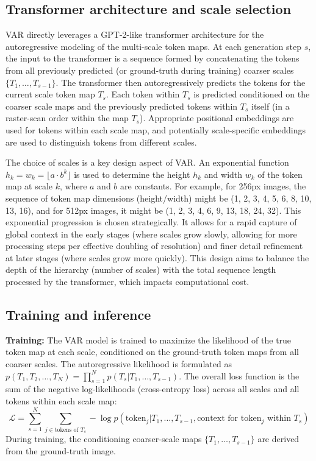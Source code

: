 \documentclass{article}
\begin{document}
\subsection{Transformer architecture and scale selection}
\label{ssec:transformer_scale_selection}

VAR directly leverages a GPT-2-like transformer architecture for the autoregressive modeling of the multi-scale token maps. At each generation step $s$, the input to the transformer is a sequence formed by concatenating the tokens from all previously predicted (or ground-truth during training) coarser scales $\{T_1, \ldots, T_{s-1}\}$. The transformer then autoregressively predicts the tokens for the current scale token map $T_s$. Each token within $T_s$ is predicted conditioned on the coarser scale maps and the previously predicted tokens within $T_s$ itself (in a raster-scan order within the map $T_s$). Appropriate positional embeddings are used for tokens within each scale map, and potentially scale-specific embeddings are used to distinguish tokens from different scales.

The choice of scales is a key design aspect of VAR. An exponential function $h_k=w_k=\lfloor a \cdot b^k \rfloor$ is used to determine the height $h_k$ and width $w_k$ of the token map at scale $k$, where $a$ and $b$ are constants. For example, for 256px images, the sequence of token map dimensions (height/width) might be (1, 2, 3, 4, 5, 6, 8, 10, 13, 16), and for 512px images, it might be (1, 2, 3, 4, 6, 9, 13, 18, 24, 32). This exponential progression is chosen strategically. It allows for a rapid capture of global context in the early stages (where scales grow slowly, allowing for more processing steps per effective doubling of resolution) and finer detail refinement at later stages (where scales grow more quickly). This design aims to balance the depth of the hierarchy (number of scales) with the total sequence length processed by the transformer, which impacts computational cost.

\subsection{Training and inference}
\label{ssec:training_inference}

\textbf{Training:} The VAR model is trained to maximize the likelihood of the true token map at each scale, conditioned on the ground-truth token maps from all coarser scales. The autoregressive likelihood is formulated as $p(T_1, T_2, \ldots, T_N) = \prod_{s=1}^{N} p(T_s | T_1, \ldots, T_{s-1})$. The overall loss function is the sum of the negative log-likelihoods (cross-entropy loss) across all scales and all tokens within each scale map:
\begin{equation}
\mathcal{L} = \sum_{s=1}^{N} \sum_{j \in \text{tokens of } T_s} -\log p(\text{token}_j | T_1, \ldots, T_{s-1}, \text{context for token}_j \text{ within } T_s)
\label{eq:loss}
\end{equation}
During training, the conditioning coarser-scale maps $\{T_1, \ldots, T_{s-1}\}$ are derived from the ground-truth image.
\end{document}
